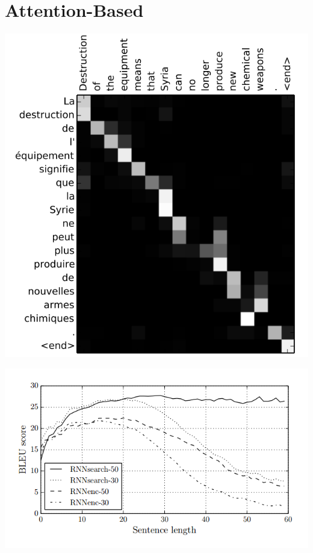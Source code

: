 \documentclass{beamer}
\begin{document}
\section{Attention-Based}

\begin{frame}
  \begin{center}
    \includegraphics{attenalign}
  \end{center}
\end{frame}

\begin{frame}
  \begin{center}
    \includegraphics{attengraph}
  \end{center}
\end{frame}
\end{document}
